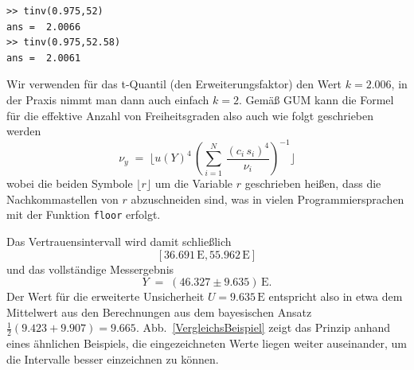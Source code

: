 \begin{lstlisting}[style=Matlab]
>> tinv(0.975,52)
ans =  2.0066
>> tinv(0.975,52.58)
ans =  2.0061
\end{lstlisting}
Wir verwenden für das t-Quantil (den Erweiterungsfaktor) den Wert $k = 2.006$, in der Praxis
nimmt man dann auch einfach $k = 2$.
Gemäß GUM kann die Formel für die effektive Anzahl von Freiheitsgraden also auch wie folgt
geschrieben werden
\begin{equation}
\nu_y \; = \;  \lfloor u(Y)^4 \, \left( \sum\limits_{i=1}^N \, \frac{ (c_i \, s_i)^4}{\nu_i}  \right)^{-1} \rfloor 
\label{SatterthwaiteFloor}
\end{equation}
wobei die beiden Symbole $\lfloor r \rfloor$ um die Variable $r$ geschrieben heißen, dass
die Nachkommastellen von $r$ abzuschneiden sind, was in vielen Programmiersprachen mit der
Funktion \texttt{floor} erfolgt.

Das Vertrauensintervall wird damit schließlich
$$
[36.691 \, \mathrm{E}, 55.962 \, \mathrm{E}]
$$
und das vollständige Messergebnis
$$
Y \; = \; (46.327 \pm 9.635) \, \mathrm{E} .
$$
Der Wert für die erweiterte Unsicherheit $U = 9.635 \, \mathrm{E}$ entspricht also in etwa
dem Mittelwert aus den Berechnungen aus dem bayesischen Ansatz $\frac{1}{2} (9.423 + 9.907) =  9.665$.
Abb.~\ref{VergleichsBeispiel} zeigt das Prinzip anhand eines ähnlichen Beispiels, die eingezeichneten Werte
liegen weiter auseinander, um die Intervalle besser einzeichnen zu können.



